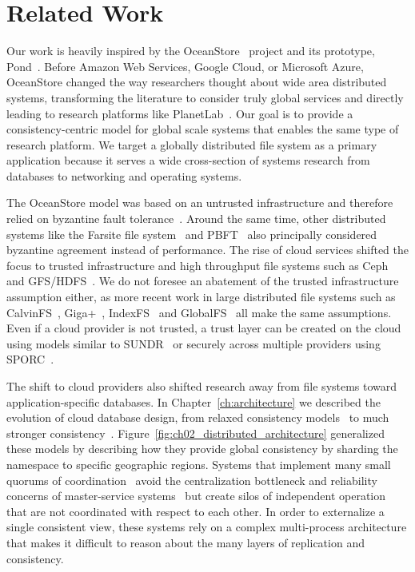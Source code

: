 
\renewcommand{\thechapter}{7}

\chapter{Related Work}
\label{ch:related_work}

Our work is heavily inspired by the OceanStore~\cite{oceanstore} project and its prototype, Pond~\cite{pond}.
Before Amazon Web Services, Google Cloud, or Microsoft Azure, OceanStore changed the way researchers thought about wide area distributed systems, transforming the literature to consider truly global services and directly leading to research platforms like PlanetLab~\cite{planetlab}.
Our goal is to provide a consistency-centric model for global scale systems that enables the same type of research platform.
We target a globally distributed file system as a primary application because it serves a wide cross-section of systems research from databases to networking and operating systems.

The OceanStore model was based on an untrusted infrastructure and therefore relied on byzantine fault tolerance~\cite{byzantine-generals, byzantine_fault_tolerance,fail-stop,ho_nysiad_2008,kotla_zyzzyva_2007,singh_zeno_2009}.
Around the same time, other distributed systems like the Farsite file system~\cite{farsite,farsite_byzantine} and PBFT~\cite{pbft} also principally considered byzantine agreement instead of performance.
The rise of cloud services shifted the focus to trusted infrastructure and high throughput file systems such as Ceph~\cite{ceph} and GFS/HDFS~\cite{gfs,hdfs,hadoop_hdfs}.
We do not foresee an abatement of the trusted infrastructure assumption either, as more recent work in large distributed file systems such as CalvinFS~\cite{calvinfs}, Giga+~\cite{giga+,giga+_scale}, IndexFS~\cite{indexfs} and GlobalFS~\cite{globalfs} all make the same assumptions.
Even if a cloud provider is not trusted, a trust layer can be created on the cloud using models similar to SUNDR~\cite{sundr} or securely across multiple providers using SPORC~\cite{sporc}.

The shift to cloud providers also shifted research away from file systems toward application-specific databases.
In Chapter~\ref{ch:architecture} we described the evolution of cloud database design, from relaxed consistency models~\cite{bigtable,dynamo,pnuts,cassandra,hbase} to much stronger consistency~\cite{megastore,spanner,aurora}.
Figure~\ref{fig:ch02_distributed_architecture} generalized these models by describing how they provide global consistency by sharding the namespace to specific geographic regions.
Systems that implement many small quorums of coordination~\cite{mdcc,scatter,spanner} avoid the centralization bottleneck and reliability concerns of master-service systems~\cite{gray_dangers_1996,gfs} but create silos of independent operation that are not coordinated with respect to each other.
In order to externalize a single consistent view, these systems rely on a complex multi-process architecture that makes it difficult to reason about the many layers of replication and consistency.

